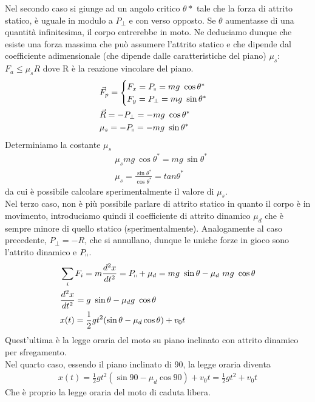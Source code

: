 Nel secondo caso si giunge ad un angolo critico $\theta*$ tale che la forza di attrito statico, è uguale in modulo a $P_\perp$ e con verso opposto. Se $\theta$ aumentasse di una quantità infinitesima, il corpo entrerebbe in moto. Ne deduciamo dunque che esiste una forza massima che può assumere l'attrito statico e che dipende dal coefficiente adimensionale (che dipende dalle caratteristiche del piano) $\mu_s$: $F_a\leq \mu_s R$ dove R è la reazione vincolare del piano.
\begin{align*}
&\vec{F}_p =
\begin{cases}
F_x=P_\shortparallel= mg\ \cos\theta^*\\
F_y=P_\perp=mg\ \sin\theta^*
\end{cases}\\
&\vec{R} = - P_\perp = - mg\ \cos\theta^*\\
&\mu_s=-P_\shortparallel=-mg\ \sin\theta^*
\end{align*}
Determiniamo la costante $\mu_s$ 
\begin{align*}
&\mu_s mg\ \cos \theta^* = mg\ \sin\theta^*\\
&\mu_s=\frac{\sin\theta^*}{\cos\theta^*}=tan\theta^*
\end{align*}
da cui è possibile calcolare sperimentalmente il valore di $\mu_s$.\\
Nel terzo caso, non è più possibile parlare di attrito statico in quanto il corpo è in movimento, introduciamo quindi il coefficiente di attrito dinamico $\mu_d$ che è sempre minore di quello statico (sperimentalmente). Analogamente al caso precedente, $P_\perp = -R$, che si annullano, dunque le uniche forze in gioco sono l'attrito dinamico e $P_\shortparallel$.
\begin{align*}
&\sum_{i} F_i= m \frac{d^2 x}{dt^2}= P_\shortparallel+\mu_d= mg\ \sin\theta-\mu_d\ m g\ \cos\theta\\
&\frac{d^2 x}{dt^2}=g\ \sin\theta-\mu_d g\ \cos\theta\\
&x(t) = \frac{1}{2} gt^2 (\sin\theta-\mu_d\cos\theta)+v_0t
\end{align*}
Quest'ultima è la legge oraria del moto su piano inclinato con attrito dinamico per sfregamento.\\
Nel quarto caso, essendo il piano inclinato di 90\textdegree, la legge oraria diventa
\begin{align*}
x(t) = \frac{1}{2} g t^2 (\sin90-\mu_d \cos90)+v_0t = \frac{1}{2} g t^2 + v_0t
\end{align*}
Che è proprio la legge oraria del moto di caduta libera.

